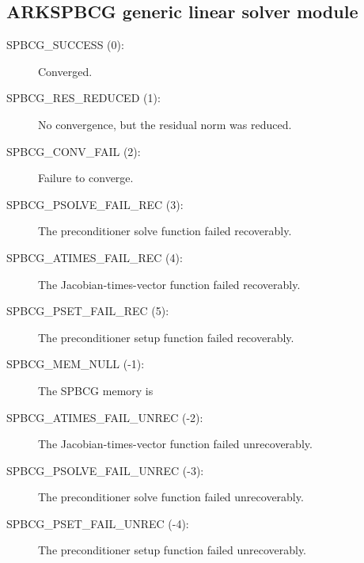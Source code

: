 \documentclass[letterpaper,10pt,english]{sphinxmanual}
\begin{document}
\subsection{ARKSPBCG generic linear solver module}
\label{Constants:arkspbcg-generic-linear-solver-module}\begin{description}
\item[{SPBCG\_SUCCESS  (0):}] \leavevmode
Converged.

\item[{SPBCG\_RES\_REDUCED  (1):}] \leavevmode
No convergence, but the residual norm
was reduced.

\item[{SPBCG\_CONV\_FAIL  (2):}] \leavevmode
Failure to converge.

\item[{SPBCG\_PSOLVE\_FAIL\_REC  (3):}] \leavevmode
The preconditioner solve function
failed recoverably.

\item[{SPBCG\_ATIMES\_FAIL\_REC  (4):}] \leavevmode
The Jacobian-times-vector function
failed recoverably.

\item[{SPBCG\_PSET\_FAIL\_REC  (5):}] \leavevmode
The preconditioner setup function
failed recoverably.

\item[{SPBCG\_MEM\_NULL  (-1):}] \leavevmode
The SPBCG memory is 

\item[{SPBCG\_ATIMES\_FAIL\_UNREC  (-2):}] \leavevmode
The Jacobian-times-vector function
failed unrecoverably.

\item[{SPBCG\_PSOLVE\_FAIL\_UNREC  (-3):}] \leavevmode
The preconditioner solve function
failed unrecoverably.

\item[{SPBCG\_PSET\_FAIL\_UNREC  (-4):}] \leavevmode
The preconditioner setup function
failed unrecoverably.

\end{description}
\end{document}
